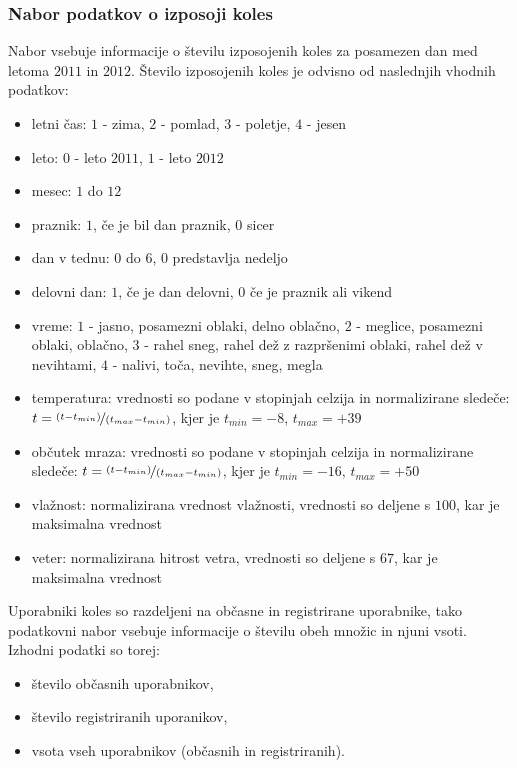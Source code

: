 \documentclass[mat1]{fmfdelo}
\begin{document}
\subsubsection{Nabor podatkov o izposoji koles}
Nabor vsebuje informacije o številu izposojenih koles za posamezen dan med letoma $2011$ in $2012$. Število izposojenih koles je odvisno od naslednjih vhodnih podatkov: 
\begin{itemize}
	\item letni čas: $1$ - zima, $2$ - pomlad, $3$ - poletje, $4$ - jesen
	\item leto: $0$ - leto $2011$, $1$ - leto $2012$
	\item mesec: $1$ do $12$
	\item praznik: $1$, če je bil dan praznik, $0$ sicer
	\item dan v tednu: $0$ do $6$, $0$ predstavlja nedeljo
	\item delovni dan: $1$, če je dan delovni, $0$ če je praznik ali vikend
	\item vreme: $1$ - jasno, posamezni oblaki, delno oblačno, $2$ - meglice, posamezni oblaki, oblačno,  $3$ - rahel sneg, rahel dež z razpršenimi oblaki, rahel dež v nevihtami, $4$ - nalivi, toča, nevihte, sneg, megla
	\item temperatura: vrednosti so podane v stopinjah celzija in normalizirane sledeče: $t=\nicefrac{(t-t_{min})}{(t_{max}-t_{min})}$, kjer je $t_{min}=-8$, $t_{max}=+39$
	\item občutek mraza: vrednosti so podane v stopinjah celzija in normalizirane sledeče: $t=\nicefrac{(t-t_{min})}{(t_{max}-t_{min})}$, kjer je $t_{min}=-16$, $t_{max}=+50$
	\item vlažnost: normalizirana vrednost vlažnosti, vrednosti so deljene s $100$, kar je maksimalna vrednost
	\item veter: normalizirana hitrost vetra, vrednosti so deljene s $67$, kar je maksimalna vrednost
\end{itemize}

Uporabniki koles so razdeljeni na občasne in registrirane uporabnike, tako podatkovni nabor vsebuje informacije o številu obeh množic in njuni vsoti. Izhodni podatki so torej:
\begin{itemize}
	\item število občasnih uporabnikov,
	\item število registriranih uporanikov,
	\item vsota vseh uporabnikov (občasnih in registriranih).
\end{itemize}
\end{document}
